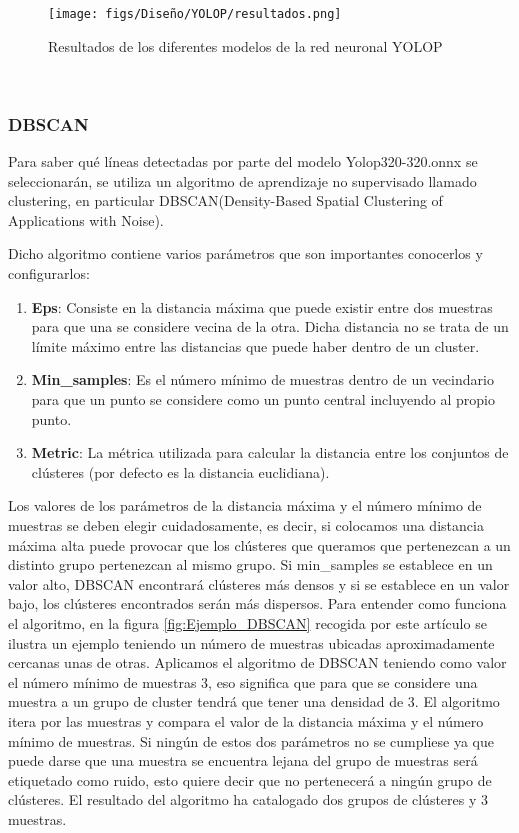 \begin{figure} [H]
  \begin{center}
    \texttt{[image: figs/Diseño/YOLOP/resultados.png]}
  \end{center}
  \caption{Resultados de los diferentes modelos de la red neuronal YOLOP}
  \label{Resultados de los diferentes modelos de la red neuronal YOLOP}
\end{figure}\

\subsubsection{DBSCAN}
\label{sec:DBSCAN}

Para saber qué líneas detectadas por parte del modelo Yolop320-320.onnx se seleccionarán, se utiliza un algoritmo de aprendizaje no supervisado llamado clustering, en particular
DBSCAN(Density-Based Spatial Clustering of Applications with Noise)\cite{ski_dbs}.\newline

Dicho algoritmo contiene varios parámetros que son importantes conocerlos y configurarlos: 
\begin{enumerate}
  \item \textbf{Eps}: Consiste en la distancia máxima que puede existir entre dos muestras para que una se considere vecina de la otra. Dicha distancia no se trata de un límite 
  máximo entre las distancias que puede haber dentro de un cluster.
  \item \textbf{Min\_samples}: Es el número mínimo de muestras dentro de un vecindario para que un punto se considere como un punto central incluyendo al propio punto.
  \item \textbf{Metric}: La métrica utilizada para calcular la distancia entre los conjuntos de clústeres (por defecto es la distancia euclidiana). 
\end{enumerate}
Los valores de los parámetros de la distancia máxima y el número mínimo de muestras se deben elegir cuidadosamente, es decir, si colocamos una distancia 
máxima alta puede provocar que los clústeres que queramos que pertenezcan a un distinto grupo pertenezcan al mismo grupo. 
Si min\_samples se establece en un valor alto, DBSCAN encontrará clústeres más densos y 
si se establece en un valor bajo, los clústeres encontrados serán más dispersos. \newline
Para entender como funciona el algoritmo, en la figura \ref{fig:Ejemplo_DBSCAN} recogida por este artículo\cite{DBSCAN} se ilustra 
un ejemplo teniendo un número de muestras ubicadas aproximadamente cercanas unas de otras. Aplicamos el algoritmo de DBSCAN 
teniendo como valor el número mínimo de muestras 3, eso significa que para que se considere una muestra a un grupo de cluster tendrá que tener una densidad de 3. El algoritmo itera por
las muestras y compara el valor de la distancia máxima y el número mínimo de muestras. 
Si ningún de estos dos parámetros no se cumpliese ya que puede darse que una muestra se encuentra lejana del grupo de muestras será etiquetado como ruido, esto quiere decir
que no pertenecerá a ningún grupo de clústeres. El resultado del algoritmo ha catalogado dos grupos de clústeres y 3 muestras. \newline

